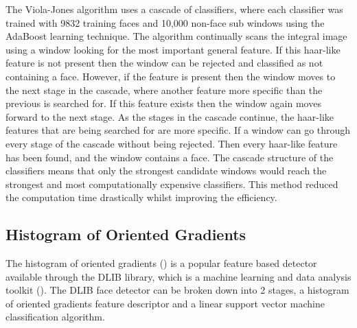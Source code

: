 \documentclass{l4proj}
\begin{document}
The Viola-Jones algorithm uses a cascade of classifiers, where each classifier was trained with 9832 training faces and 10,000 non-face sub windows using the AdaBoost learning technique. The algorithm continually scans the integral image using a window looking for the most important general feature. If this haar-like feature is not present then the window can be rejected and classified as not containing a face. However, if the feature is present then the window moves to the next stage in the cascade, where another feature more specific than the previous is searched for. If this feature exists then the window again moves forward to the next stage. As the stages in the cascade continue, the haar-like features that are being searched for are more specific. If a window can go through every stage of the cascade without being rejected. Then every haar-like feature has been found, and the window contains a face. The cascade structure of the classifiers means that only the strongest candidate windows would reach the strongest and most computationally expensive classifiers. This method reduced the computation time drastically whilst improving the efficiency. 


\subsection{Histogram of Oriented Gradients}
\label{hog}
The histogram of oriented gradients (\cite{hog}) is a popular feature based detector available through the DLIB library, which is a machine learning and data analysis toolkit (\cite{dlib}). The DLIB face detector can be broken down into 2 stages, a histogram of oriented gradients feature descriptor and a linear support vector machine classification algorithm. 
\end{document}
